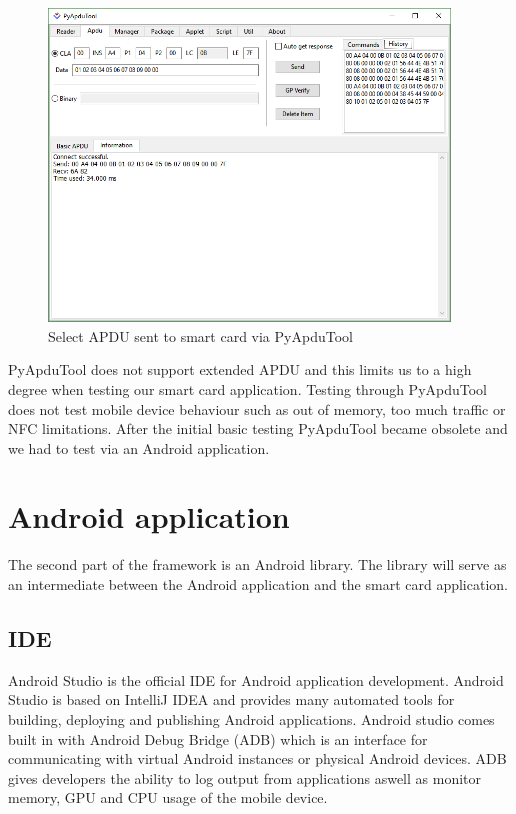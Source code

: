 \begin{figure}[h!]
  \caption{Select APDU sent to smart card via PyApduTool}
  \label{fig:pyapdutool}
  \centering
    \includegraphics[width=0.95\textwidth]{images/pyapdutool.png}
\end{figure}

PyApduTool does not support extended APDU and this limits us to a high degree when testing our smart card application. Testing through PyApduTool does not test mobile device behaviour such as out of memory, too much traffic or NFC limitations. After the initial basic testing PyApduTool became obsolete and we had to test via an Android application.


\section{Android application}
The second part of the framework is an Android library. The library will serve as an intermediate between the Android application and the smart card application.

\subsection{IDE}
Android Studio \cite{androidIDE} is the official IDE for Android application development. Android Studio is based on IntelliJ IDEA \cite{intelliJIDEA} and provides many automated tools for building, deploying and publishing Android applications. Android studio comes built in with Android Debug Bridge (ADB) which is an interface for communicating with virtual Android instances or physical Android devices. ADB gives developers the ability to log output from applications aswell as monitor memory, GPU and CPU usage of the mobile device.

